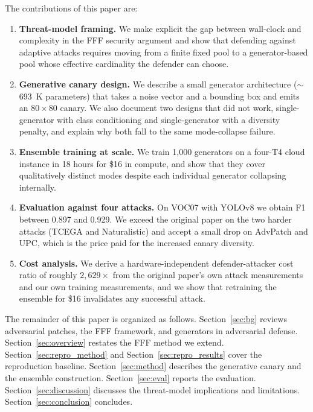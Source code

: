 \documentclass[conference]{IEEEtran}
\begin{document}
The contributions of this paper are:
\begin{enumerate}[leftmargin=*]
    \item \textbf{Threat-model framing.} We make explicit the gap between
    wall-clock and complexity in the FFF security argument and show that
    defending against adaptive attacks requires moving from a finite fixed
    pool to a generator-based pool whose effective cardinality the defender
    can choose.
    \item \textbf{Generative canary design.} We describe a small generator
    architecture ($\sim$693~K parameters) that takes a noise vector and a
    bounding box and emits an $80\times80$ canary. We also document two
    designs that did not work, single-generator with class conditioning and
    single-generator with a diversity penalty, and explain why both fall to
    the same mode-collapse failure.
    \item \textbf{Ensemble training at scale.} We train 1{,}000 generators
    on a four-T4 cloud instance in 18 hours for \$16 in compute, and show
    that they cover qualitatively distinct modes despite each individual
    generator collapsing internally.
    \item \textbf{Evaluation against four attacks.} On VOC07 with YOLOv8 we
    obtain F1 between 0.897 and 0.929. We exceed the original paper on the
    two harder attacks (TCEGA and Naturalistic) and accept a small drop on
    AdvPatch and UPC, which is the price paid for the increased canary
    diversity.
    \item \textbf{Cost analysis.} We derive a hardware-independent
    defender-attacker cost ratio of roughly $2{,}629\times$ from the
    original paper's own attack measurements and our own training
    measurements, and we show that retraining the ensemble for \$16
    invalidates any successful attack.
\end{enumerate}

The remainder of this paper is organized as follows.
Section~\ref{sec:bg} reviews adversarial patches, the FFF framework, and
generators in adversarial defense.
Section~\ref{sec:overview} restates the FFF method we extend.
Section~\ref{sec:repro_method} and Section~\ref{sec:repro_results} cover the
reproduction baseline.
Section~\ref{sec:method} describes the generative canary and the ensemble
construction.
Section~\ref{sec:eval} reports the evaluation.
Section~\ref{sec:discussion} discusses the threat-model implications and
limitations.
Section~\ref{sec:conclusion} concludes.
\end{document}
